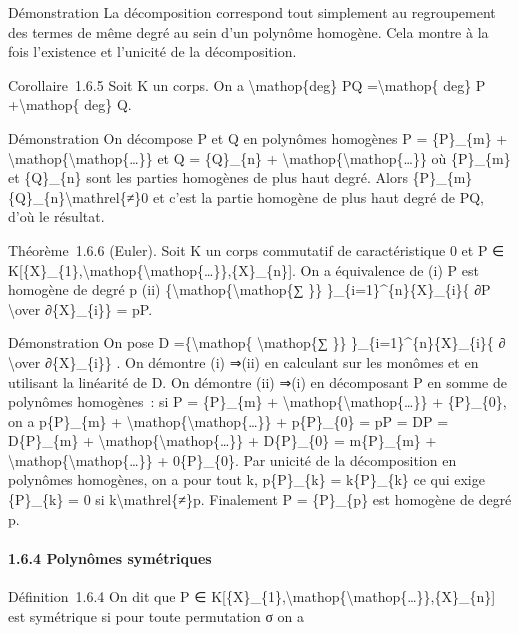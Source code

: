 \documentclass[]{article}
\begin{document}
Démonstration La décomposition correspond tout simplement au
regroupement des termes de même degré au sein d'un polynôme homogène.
Cela montre à la fois l'existence et l'unicité de la décomposition.

Corollaire~1.6.5 Soit K un corps. On a \textbackslash{}mathop\{deg\} PQ
=\textbackslash{}mathop\{ deg\} P +\textbackslash{}mathop\{ deg\} Q.

Démonstration On décompose P et Q en polynômes homogènes P =
\{P\}\_\{m\} +
\textbackslash{}mathop\{\textbackslash{}mathop\{\ldots{}\}\} et Q =
\{Q\}\_\{n\} +
\textbackslash{}mathop\{\textbackslash{}mathop\{\ldots{}\}\} où
\{P\}\_\{m\} et \{Q\}\_\{n\} sont les parties homogènes de plus haut
degré. Alors \{P\}\_\{m\}\{Q\}\_\{n\}\textbackslash{}mathrel\{≠\}0 et
c'est la partie homogène de plus haut degré de PQ, d'où le résultat.

Théorème~1.6.6 (Euler). Soit K un corps commutatif de caractéristique 0
et P ∈
K{[}\{X\}\_\{1\},\textbackslash{}mathop\{\textbackslash{}mathop\{\ldots{}\}\},\{X\}\_\{n\}{]}.
On a équivalence de (i) P est homogène de degré p (ii)
\{\textbackslash{}mathop\{\textbackslash{}mathop\{∑ \}\}
\}\_\{i=1\}\^{}\{n\}\{X\}\_\{i\}\{ ∂P \textbackslash{}over
∂\{X\}\_\{i\}\} = pP.

Démonstration On pose D =\{\textbackslash{}mathop\{
\textbackslash{}mathop\{∑ \}\} \}\_\{i=1\}\^{}\{n\}\{X\}\_\{i\}\{ ∂
\textbackslash{}over ∂\{X\}\_\{i\}\} . On démontre (i) ⇒(ii) en
calculant sur les monômes et en utilisant la linéarité de D. On démontre
(ii) ⇒(i) en décomposant P en somme de polynômes homogènes~: si P =
\{P\}\_\{m\} +
\textbackslash{}mathop\{\textbackslash{}mathop\{\ldots{}\}\} +
\{P\}\_\{0\}, on a p\{P\}\_\{m\} +
\textbackslash{}mathop\{\textbackslash{}mathop\{\ldots{}\}\} +
p\{P\}\_\{0\} = pP = DP = D\{P\}\_\{m\} +
\textbackslash{}mathop\{\textbackslash{}mathop\{\ldots{}\}\} +
D\{P\}\_\{0\} = m\{P\}\_\{m\} +
\textbackslash{}mathop\{\textbackslash{}mathop\{\ldots{}\}\} +
0\{P\}\_\{0\}. Par unicité de la décomposition en polynômes homogènes,
on a pour tout k, p\{P\}\_\{k\} = k\{P\}\_\{k\} ce qui exige
\{P\}\_\{k\} = 0 si k\textbackslash{}mathrel\{≠\}p. Finalement P =
\{P\}\_\{p\} est homogène de degré p.

\paragraph{1.6.4 Polynômes symétriques}

Définition~1.6.4 On dit que P ∈
K{[}\{X\}\_\{1\},\textbackslash{}mathop\{\textbackslash{}mathop\{\ldots{}\}\},\{X\}\_\{n\}{]}
est symétrique si pour toute permutation σ on a
\end{document}
